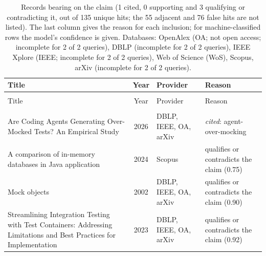 
\begingroup\footnotesize
\begin{longtable}{@{}%
  >{\raggedright\arraybackslash}p{}c%
  >{\raggedright\arraybackslash}p{}%
  >{\raggedright\arraybackslash}p{}@{}}
\caption{Records bearing on the claim (1 cited, 0 supporting and 3 qualifying or contradicting it, out of 135 unique hits; the 55 adjacent and 76 false hits are not listed). The last column gives the reason for each inclusion; for machine-classified rows the model's confidence is given. Databases: OpenAlex (OA; not open access; incomplete for 2 of 2 queries), DBLP (incomplete for 2 of 2 queries), IEEE Xplore (IEEE; incomplete for 2 of 2 queries), Web of Science (WoS), Scopus, arXiv (incomplete for 2 of 2 queries).}\label{tab:t-real-local}\\
\toprule
Title & Year & Provider & Reason \\
\midrule
\endfirsthead
\multicolumn{4}{@{}l}{\emph{\tablename~\thetable{} (cont.)}}\\
\toprule
Title & Year & Provider & Reason \\
\midrule
\endhead
\midrule \multicolumn{4}{r@{}}{\emph{continued on next page}}\\
\endfoot
\bottomrule
\endlastfoot
Are Coding Agents Generating Over-Mocked Tests? An Empirical Study & 2026 & DBLP, IEEE, OA, arXiv & \emph{cited}: agent-over-mocking \\
A comparison of in-memory databases in Java application & 2024 & Scopus & qualifies or contradicts the claim (0.75) \\
Mock objects & 2002 & DBLP, IEEE, OA, arXiv & qualifies or contradicts the claim (0.90) \\
Streamlining Integration Testing with Test Containers: Addressing Limitations and Best Practices for Implementation & 2023 & DBLP, IEEE, OA, arXiv & qualifies or contradicts the claim (0.92) \\
\end{longtable}
\endgroup
